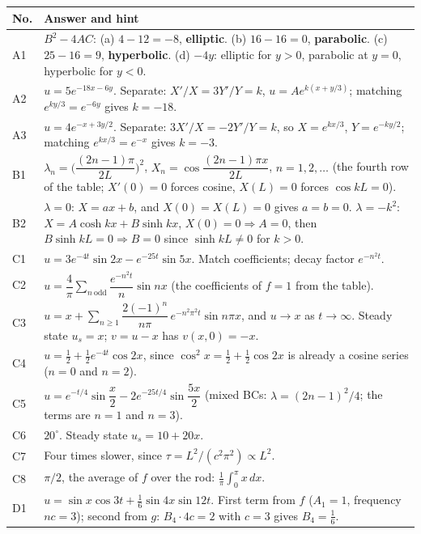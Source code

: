 \documentclass[11pt]{article}
\begin{document}
\renewcommand{\arraystretch}{1.5}
\begin{longtable}{|p{1.4cm}|p{14cm}|}
\hline
\textbf{No.} & \textbf{Answer and hint}\\
\hline
A1 & $B^2-4AC$: (a) $4-12=-8$, \textbf{elliptic}. (b) $16-16=0$, \textbf{parabolic}. (c) $25-16=9$, \textbf{hyperbolic}. (d) $-4y$: elliptic for $y>0$, parabolic at $y=0$, hyperbolic for $y<0$.\\
\hline
A2 & $u=5e^{-18x-6y}$. Separate: $X'/X=3Y'/Y=k$, $u=Ae^{k(x+y/3)}$; matching $e^{ky/3}=e^{-6y}$ gives $k=-18$.\\
\hline
A3 & $u=4e^{-x+3y/2}$. Separate: $3X'/X=-2Y'/Y=k$, so $X=e^{kx/3}$, $Y=e^{-ky/2}$; matching $e^{kx/3}=e^{-x}$ gives $k=-3$.\\
\hline
B1 & $\lambda_n=\Big(\dfrac{(2n-1)\pi}{2L}\Big)^2$, $X_n=\cos\dfrac{(2n-1)\pi x}{2L}$, $n=1,2,\dots$ (the fourth row of the table; $X'(0)=0$ forces cosine, $X(L)=0$ forces $\cos kL=0$).\\
\hline
B2 & $\lambda=0$: $X=ax+b$, and $X(0)=X(L)=0$ gives $a=b=0$. $\lambda=-k^2$: $X=A\cosh kx+B\sinh kx$, $X(0)=0\Rightarrow A=0$, then $B\sinh kL=0\Rightarrow B=0$ since $\sinh kL\neq0$ for $k>0$.\\
\hline
C1 & $u=3e^{-4t}\sin2x-e^{-25t}\sin5x$. Match coefficients; decay factor $e^{-n^2t}$.\\
\hline
C2 & $u=\dfrac4\pi\displaystyle\sum_{n\ \mathrm{odd}}\dfrac{e^{-n^2t}}{n}\sin nx$ (the coefficients of $f=1$ from the table).\\
\hline
C3 & $u=x+\displaystyle\sum_{n\ge1}\dfrac{2(-1)^n}{n\pi}\,e^{-n^2\pi^2t}\sin n\pi x$, and $u\to x$ as $t\to\infty$. Steady state $u_s=x$; $v=u-x$ has $v(x,0)=-x$.\\
\hline
C4 & $u=\tfrac12+\tfrac12e^{-4t}\cos2x$, since $\cos^2x=\tfrac12+\tfrac12\cos2x$ is already a cosine series ($n=0$ and $n=2$).\\
\hline
C5 & $u=e^{-t/4}\sin\dfrac x2-2e^{-25t/4}\sin\dfrac{5x}{2}$ (mixed BCs: $\lambda=(2n-1)^2/4$; the terms are $n=1$ and $n=3$).\\
\hline
C6 & $20^\circ$. Steady state $u_s=10+20x$.\\
\hline
C7 & Four times slower, since $\tau=L^2/(c^2\pi^2)\propto L^2$.\\
\hline
C8 & $\pi/2$, the average of $f$ over the rod: $\frac1\pi\int_0^\pi x\,dx$.\\
\hline
D1 & $u=\sin x\cos3t+\tfrac16\sin4x\sin12t$. First term from $f$ ($A_1=1$, frequency $nc=3$); second from $g$: $B_4\cdot4c=2$ with $c=3$ gives $B_4=\tfrac16$.\\

\end{longtable}
\end{document}

